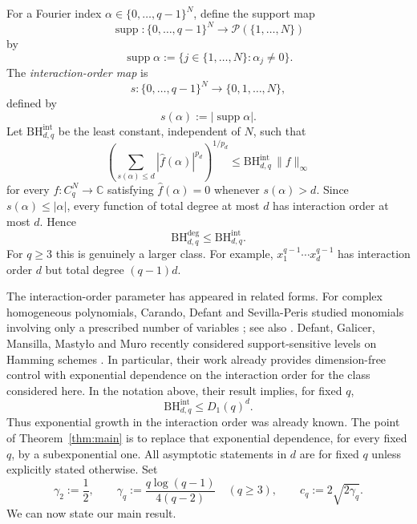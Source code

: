 \documentclass[11pt,a4paper]{article}
\numberwithin{equation}{section}
\theoremstyle{cleanplain}
\theoremstyle{cleandefinition}
\theoremstyle{cleanremark}
\newcommand{\C}{\mathbb C}
\newcommand{\supp}{\operatorname{supp}}
\newcommand{\BHdeg}[2]{\mathrm{BH}^{\mathrm{deg}}_{#1,#2}}
\newcommand{\BHint}[2]{\mathrm{BH}^{\mathrm{int}}_{#1,#2}}
\begin{document}
For a Fourier index $\alpha\in\{0,\ldots,q-1\}^N$, define the support map
\[
 \supp:\{0,\ldots,q-1\}^N\longrightarrow
 \mathcal P(\{1,\ldots,N\})
\]
by
\begin{equation}\label{eq:support-intro}
 \supp\alpha:=\{j\in\{1,\ldots,N\}:\alpha_j\neq0\}.
\end{equation}
The \emph{interaction-order map} is
\[
 s:\{0,\ldots,q-1\}^N\longrightarrow\{0,1,\ldots,N\},
\]
defined by
\begin{equation}\label{eq:interaction-order-intro}
 s(\alpha):=|\supp\alpha|.
\end{equation}
Let $\BHint{d}{q}$ be the least constant,
independent of $N$, such that
\begin{equation}\label{eq:interaction-BH-intro}
 \left(
 \sum_{s(\alpha)\leq d}|\widehat f(\alpha)|^{p_d}
 \right)^{1/p_d}
 \leq \BHint{d}{q}\,\|f\|_\infty
\end{equation}
for every $f:C_q^N\to\C$ satisfying
$\widehat f(\alpha)=0$ whenever $s(\alpha)>d$.  Since
$s(\alpha)\leq|\alpha|$, every function of total degree at most $d$ has
interaction order at most $d$.  Hence
\begin{equation}\label{eq:constant-comparison-intro}
 \BHdeg{d}{q}\leq\BHint{d}{q}.
\end{equation}
For $q\geq3$ this is genuinely a larger class.  For example,
$x_1^{q-1}\cdots x_d^{q-1}$ has interaction order $d$ but total degree
$(q-1)d$.

The interaction-order parameter has appeared in related forms.  For complex
homogeneous polynomials, Carando, Defant and Sevilla-Peris studied monomials
involving only a prescribed number of variables \cite{CDS}; see also
\cite{MNP,CNS}.  Defant, Galicer, Mansilla, Masty\l o and Muro recently
considered support-sensitive levels on Hamming schemes
\cite[Theorem~2.13]{DGMMM}.  {\color{black}In particular, their work already provides dimension-free control with exponential dependence on the interaction order for the class considered here.}  In the notation above, their result implies, for
fixed $q$,
\begin{equation}\label{eq:DGMMM-intro-bound}
 \BHint{d}{q}\leq D_1(q)^d.
\end{equation}
{\color{black}Thus exponential growth in the interaction order was already known.  The point of Theorem~\ref{thm:main} is to replace that exponential dependence, for every fixed $q$, by a subexponential one.}
{\color{black}All asymptotic statements in $d$ are for fixed $q$ unless explicitly stated otherwise.}
Set
\begin{equation}\label{eq:gamma-cq-intro}
 \gamma_2:=\frac12,
 \qquad
 \gamma_q:=\frac{q\log(q-1)}{4(q-2)}\quad(q\geq3),
 \qquad
 c_q:=2\sqrt{2\gamma_q}.
\end{equation}
{\color{black}We can now state our main result.}
\end{document}
